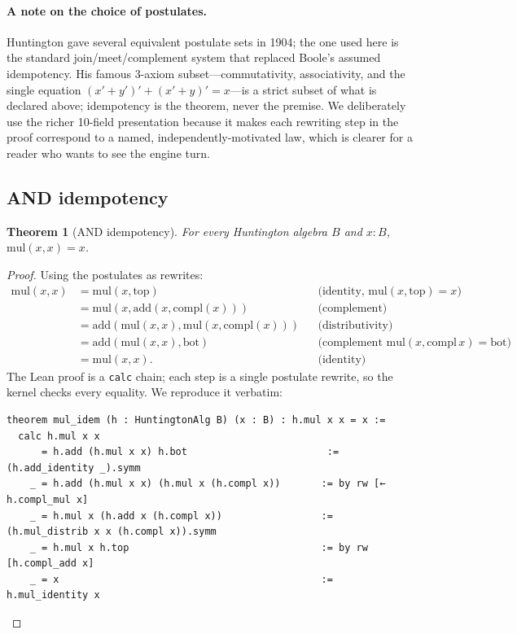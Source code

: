 \documentclass[11pt]{article}
\newtheorem{theorem}{Theorem}[section]
\theoremstyle{definition}
\begin{document}
\paragraph{A note on the choice of postulates.}
Huntington gave several equivalent postulate sets in 1904; the one used here is
the standard join/meet/complement system that replaced Boole's assumed
idempotency. His famous 3-axiom subset---commutativity, associativity, and the
single equation $(x' + y')' + (x' + y)' = x$---is a strict subset of what is
declared above; idempotency is the theorem, never the premise. We deliberately
use the richer 10-field presentation because it makes each rewriting step in
the proof correspond to a named, independently-motivated law, which is clearer
for a reader who wants to see the engine turn.

\subsection{AND idempotency}
\label{sec:boole-mul}

\begin{theorem}[AND idempotency]\label{thm:mulidem}
For every Huntington algebra $B$ and $x:B$, $\mathrm{mul}(x,x)=x$.
\end{theorem}
\begin{proof}
Using the postulates as rewrites:
\begin{align*}
\mathrm{mul}(x,x)
 &= \mathrm{mul}(x,\mathrm{top})            &&\text{(identity, } \mathrm{mul}(x,\mathrm{top})=x\text{)}\\
 &= \mathrm{mul}(x,\mathrm{add}(x,\mathrm{compl}(x))) &&\text{(complement)}\\
 &= \mathrm{add}(\mathrm{mul}(x,x),\mathrm{mul}(x,\mathrm{compl}(x))) &&\text{(distributivity)}\\
 &= \mathrm{add}(\mathrm{mul}(x,x),\mathrm{bot}) &&\text{(complement } \mathrm{mul}(x,\mathrm{compl}\,x)=\mathrm{bot})\\
 &= \mathrm{mul}(x,x).                        &&\text{(identity)}
\end{align*}
The Lean proof is a \texttt{calc} chain; each step is a single postulate
rewrite, so the kernel checks every equality. We reproduce it verbatim:
\begin{lstlisting}[language=leanL,caption={AND idempotency (Boole\_Idempotency.lean).}]
theorem mul_idem (h : HuntingtonAlg B) (x : B) : h.mul x x = x :=
  calc h.mul x x
      = h.add (h.mul x x) h.bot                        := (h.add_identity _).symm
    _ = h.add (h.mul x x) (h.mul x (h.compl x))       := by rw [← h.compl_mul x]
    _ = h.mul x (h.add x (h.compl x))                 := (h.mul_distrib x x (h.compl x)).symm
    _ = h.mul x h.top                                 := by rw [h.compl_add x]
    _ = x                                             := h.mul_identity x
\end{lstlisting}
\end{proof}
\end{document}
